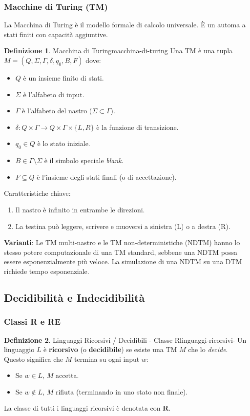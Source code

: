 \documentclass[a4paper]{article}
\theoremstyle{definition} %
\newtheorem{definition}{Definizione}
\begin{document}
\subsubsection{Macchine di Turing (TM)}
La Macchina di Turing è il modello formale di calcolo universale. È un automa a stati finiti con capacità aggiuntive.
\begin{definition}{Macchina di Turing}{macchina-di-turing}
Una TM è una tupla $M = (Q, \Sigma, \Gamma, \delta, q_0, B, F)$ dove:
\begin{itemize}
    \item $Q$ è un insieme finito di stati.
    \item $\Sigma$ è l'alfabeto di input.
    \item $\Gamma$ è l'alfabeto del nastro ($\Sigma \subset \Gamma$).
    \item $\delta: Q \times \Gamma \to Q \times \Gamma \times \{L, R\}$ è la funzione di transizione.
    \item $q_0 \in Q$ è lo stato iniziale.
    \item $B \in \Gamma \setminus \Sigma$ è il simbolo speciale \emph{blank}.
    \item $F \subseteq Q$ è l'insieme degli stati finali (o di accettazione).
\end{itemize}
\end{definition}
Caratteristiche chiave:
\begin{enumerate}
    \item Il nastro è infinito in entrambe le direzioni.
    \item La testina può leggere, scrivere e muoversi a sinistra (L) o a destra (R).
\end{enumerate}
\textbf{Varianti}: Le TM multi-nastro e le TM non-deterministiche (NDTM) hanno lo stesso potere computazionale di una TM standard, sebbene una NDTM possa essere esponenzialmente più veloce. La simulazione di una NDTM su una DTM richiede tempo esponenziale.

\subsection{Decidibilità e Indecidibilità}
\subsubsection{Classi R e RE}
\begin{definition}{Linguaggi Ricorsivi / Decidibili - Classe R}{linguaggi-ricorsivi-}
Un linguaggio $L$ è \textbf{ricorsivo} (o \textbf{decidibile}) se esiste una TM $M$ che lo \emph{decide}. Questo significa che $M$ termina su ogni input $w$:
\begin{itemize}
    \item Se $w \in L$, $M$ accetta.
    \item Se $w \notin L$, $M$ rifiuta (terminando in uno stato non finale).
\end{itemize}
La classe di tutti i linguaggi ricorsivi è denotata con $\mathbf{R}$.
\end{definition}
\end{document}
